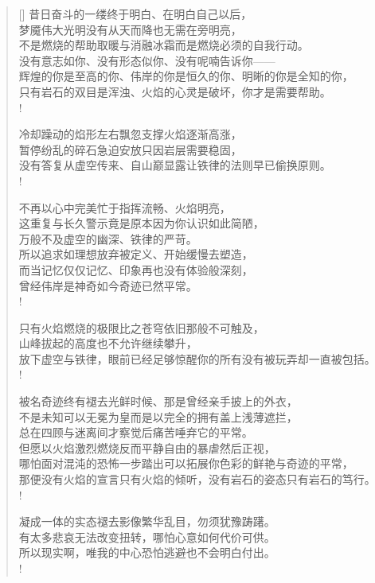 \documentclass[UTF8, 12pt, a4paper]{ctexrep} %
\begin{document}
\begin{verse}[\versewidth]
昔日奋斗的一缕终于明白、在明白自己以后，\\
梦魇伟大光明没有从天而降也无需在旁明亮，\\
不是燃烧的帮助取暖与消融冰霜而是燃烧必须的自我行动。\\
没有意志如你、没有形态似你、没有呢喃告诉你——\\
辉煌的你是至高的你、伟岸的你是恒久的你、明晰的你是全知的你，\\
只有岩石的双目是浑浊、火焰的心灵是破坏，你才是需要帮助。\\!

冷却躁动的焰形左右飘忽支撑火焰逐渐高涨，\\
暂停纷乱的碎石急迫安放只因岩层需要稳固，\\
没有答复从虚空传来、自山巅显露让铁律的法则早已偷换原则。\\!

不再以心中完美忙于指挥流畅、火焰明亮，\\
这重复与长久警示竟是原本因为你认识如此简陋，\\
万般不及虚空的幽深、铁律的严苛。\\
所以追求如理想放弃被定义、开始缓慢去塑造，\\
而当记忆仅仅记忆、印象再也没有体验般深刻，\\
曾经伟岸是神奇如今奇迹已然平常。\\!

只有火焰燃烧的极限比之苍穹依旧那般不可触及，\\
山峰拔起的高度也不允许继续攀升，\\
放下虚空与铁律，眼前已经足够惊醒你的所有没有被玩弄却一直被包括。\\!

被名奇迹终有褪去光鲜时候、那是曾经亲手披上的外衣，\\
不是未知可以无冕为皇而是以完全的拥有盖上浅薄遮拦，\\
总在四顾与迷离间才察觉后痛苦唾弃它的平常。\\
但愿以火焰激烈燃烧反而平静自由的暴虐然后正视，\\
哪怕面对混沌的恐怖一步踏出可以拓展你色彩的鲜艳与奇迹的平常，\\
那便没有火焰的宣言只有火焰的倾听，没有岩石的姿态只有岩石的笃行。\\!

凝成一体的实态褪去影像繁华乱目，勿须犹豫踌躇。\\
有太多悲哀无法改变扭转，哪怕心意如何代价可供。\\
所以现实啊，唯我的中心恐怕逃避也不会明白付出。\\!


\end{verse}
\end{document}

